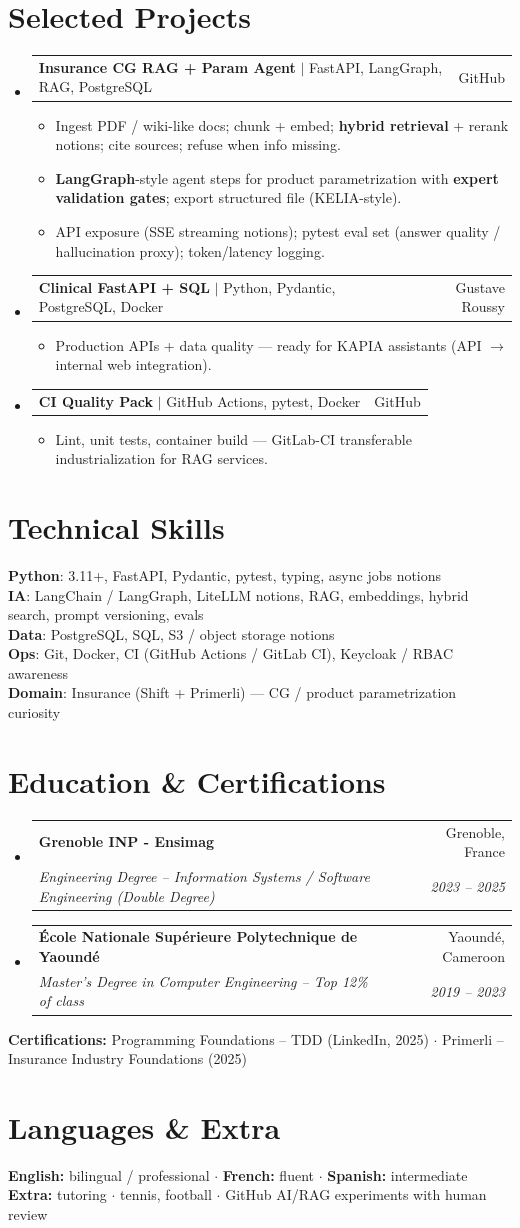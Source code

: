\documentclass[letterpaper,10.5pt]{article}
\makeatletter
\newcommand{\resumeItem}[1]{\item\small{#1 \vspace{-1.5pt}}}
\newcommand{\resumeSubheading}[4]{\vspace{-1pt}\item\begin{tabular*}{0.97\textwidth}[t]{l@{\extracolsep{\fill}}r}\textbf{#1} & #2 \\\textit{\small#3} & \textit{\small #4} \\\end{tabular*}\vspace{-5pt}}
\newcommand{\resumeProjectHeading}[2]{\item\begin{tabular*}{0.97\textwidth}{l@{\extracolsep{\fill}}r}\small#1 & #2 \\\end{tabular*}\vspace{-5pt}}
\newcommand{\resumeSubHeadingListStart}{\begin{itemize}[leftmargin=0.15in, label={}]}
\newcommand{\resumeSubHeadingListEnd}{\end{itemize}}
\newcommand{\resumeItemListStart}{\begin{itemize}[leftmargin=0.18in]}
\newcommand{\resumeItemListEnd}{\end{itemize}\vspace{-3pt}}
\makeatother
\begin{document}
\section{Selected Projects}
\resumeSubHeadingListStart
  \resumeProjectHeading{\textbf{Insurance CG RAG + Param Agent} $|$ FastAPI, LangGraph, RAG, PostgreSQL}{GitHub}
    \resumeItemListStart
      \resumeItem{Ingest PDF / wiki-like docs; chunk + embed; \textbf{hybrid retrieval} + rerank notions; cite sources; refuse when info missing.}
      \resumeItem{\textbf{LangGraph}-style agent steps for product parametrization with \textbf{expert validation gates}; export structured file (KELIA-style).}
      \resumeItem{API exposure (SSE streaming notions); pytest eval set (answer quality / hallucination proxy); token/latency logging.}
    \resumeItemListEnd
  \resumeProjectHeading{\textbf{Clinical FastAPI + SQL} $|$ Python, Pydantic, PostgreSQL, Docker}{Gustave Roussy}
    \resumeItemListStart
      \resumeItem{Production APIs + data quality --- ready for KAPIA assistants (API $\rightarrow$ internal web integration).}
    \resumeItemListEnd
  \resumeProjectHeading{\textbf{CI Quality Pack} $|$ GitHub Actions, pytest, Docker}{GitHub}
    \resumeItemListStart
      \resumeItem{Lint, unit tests, container build --- GitLab-CI transferable industrialization for RAG services.}
    \resumeItemListEnd
\resumeSubHeadingListEnd
\section{Technical Skills}
\begin{itemize}[leftmargin=0.15in, label={}]\small{\item{
\textbf{Python}: 3.11+, FastAPI, Pydantic, pytest, typing, async jobs notions \\
\textbf{IA}: LangChain / LangGraph, LiteLLM notions, RAG, embeddings, hybrid search, prompt versioning, evals \\
\textbf{Data}: PostgreSQL, SQL, S3 / object storage notions \\
\textbf{Ops}: Git, Docker, CI (GitHub Actions / GitLab CI), Keycloak / RBAC awareness \\
\textbf{Domain}: Insurance (Shift + Primerli) --- CG / product parametrization curiosity
}}\end{itemize}
\section{Education \& Certifications}
\resumeSubHeadingListStart
  \resumeSubheading{Grenoble INP - Ensimag}{Grenoble, France}{Engineering Degree -- Information Systems / Software Engineering (Double Degree)}{2023 -- 2025}
  \resumeSubheading{\'Ecole Nationale Sup\'erieure Polytechnique de Yaound\'e}{Yaound\'e, Cameroon}{Master's Degree in Computer Engineering -- Top 12\% of class}{2019 -- 2023}
\resumeSubHeadingListEnd
\small{\textbf{Certifications:} Programming Foundations -- TDD (LinkedIn, 2025) $\cdot$ Primerli -- Insurance Industry Foundations (2025)}
\section{Languages \& Extra}
\small{\textbf{English:} bilingual / professional $\cdot$ \textbf{French:} fluent $\cdot$ \textbf{Spanish:} intermediate \\ \textbf{Extra:} tutoring $\cdot$ tennis, football $\cdot$ GitHub AI/RAG experiments with human review}
\end{document}
